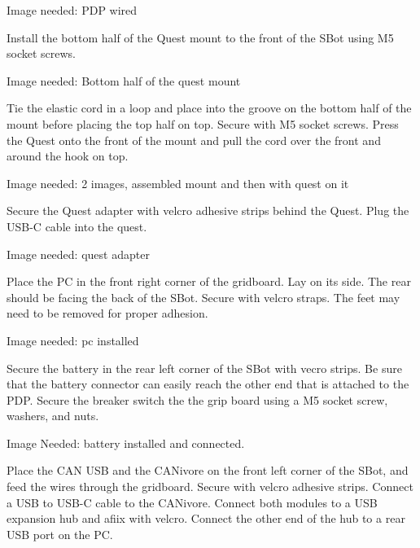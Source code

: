 \begin{tipbox}
    Image needed: PDP wired
\end{tipbox}

Install the bottom half of the Quest mount to the front of the SBot using M5 socket screws.

\begin{tipbox}
    Image needed: Bottom half of the quest mount
\end{tipbox}

Tie the elastic cord in a loop and place into the groove on the bottom half of the mount before placing the top half on top. Secure with M5 socket screws. Press the Quest onto the front of the mount and pull the cord over the front and around the hook on top.

\begin{tipbox}
    Image needed: 2 images, assembled mount and then with quest on it
\end{tipbox}

Secure the Quest adapter with velcro adhesive strips behind the Quest. Plug the USB-C cable into the quest.

\begin{tipbox}
    Image needed: quest adapter
\end{tipbox}

Place the PC in the front right corner of the gridboard. Lay on its side. The rear should be facing the back of the SBot. Secure with velcro straps. The feet may need to be removed for proper adhesion. 

\begin{tipbox}
    Image needed: pc installed
\end{tipbox}

Secure the battery in the rear left corner of the SBot with vecro strips. Be sure that the battery connector can easily reach the other end that is attached to the PDP. Secure the breaker switch the the grip board using a M5 socket screw, washers, and nuts.

\begin{tipbox}
    Image Needed: battery installed and connected.
\end{tipbox}

Place the CAN USB and the CANivore on the front left corner of the SBot, and feed the wires through the gridboard. Secure with velcro adhesive strips. Connect a USB to USB-C cable to the CANivore. Connect both modules to a USB expansion hub and afiix with velcro. Connect the other end of the hub to a rear USB port on the PC.

